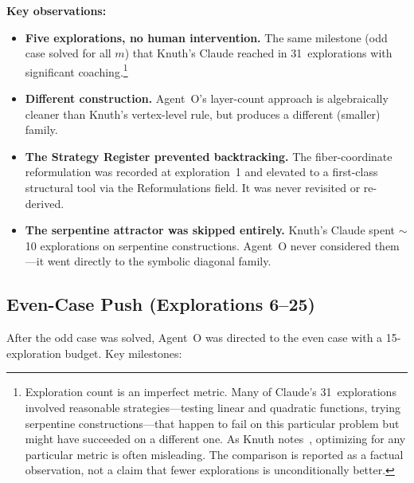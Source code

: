 \documentclass[11pt]{article}
\theoremstyle{definition}
\theoremstyle{remark}
\begin{document}
\textbf{Key observations:}
\begin{itemize}
    \item \textbf{Five explorations, no human intervention.} The same milestone (odd case solved for all $m$) that Knuth's Claude reached in 31~explorations with significant coaching.\footnote{Exploration count is an imperfect metric. Many of Claude's 31~explorations involved reasonable strategies---testing linear and quadratic functions, trying serpentine constructions---that happen to fail on this particular problem but might have succeeded on a different one. As Knuth notes~\cite{knuth-pc}, optimizing for any particular metric is often misleading. The comparison is reported as a factual observation, not a claim that fewer explorations is unconditionally better.}
    \item \textbf{Different construction.} Agent~O's layer-count approach is algebraically cleaner than Knuth's vertex-level rule, but produces a different (smaller) family.
    \item \textbf{The Strategy Register prevented backtracking.} The fiber-coordinate reformulation was recorded at exploration~1 and elevated to a first-class structural tool via the Reformulations field. It was never revisited or re-derived.
    \item \textbf{The serpentine attractor was skipped entirely.} Knuth's Claude spent $\sim$10 explorations on serpentine constructions. Agent~O never considered them---it went directly to the symbolic diagonal family.
\end{itemize}

\subsection{Even-Case Push (Explorations 6--25)}

After the odd case was solved, Agent~O was directed to the even case with a 15-exploration budget. Key milestones:
\end{document}
